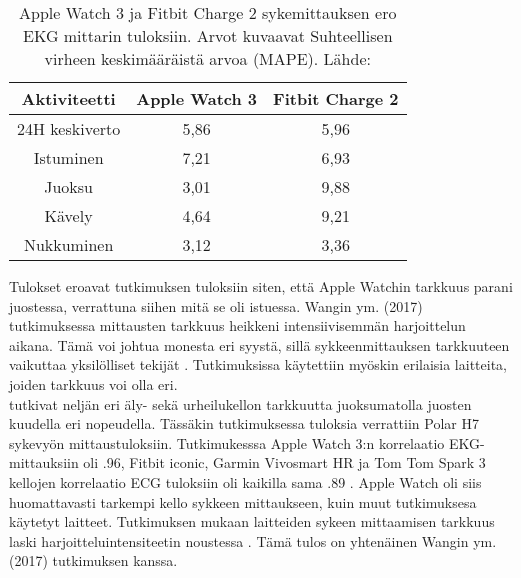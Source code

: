 \documentclass[utf8,bachelor,finnish]{bachelor}
\begin{document}
    \begin{table}[H]
     \begin{center}
      \begin{tabular}{||c c c||}   
       \hline
       Aktiviteetti & Apple Watch 3 & Fitbit Charge 2\\ [0.5ex] 
       \hline\hline
       24H keskiverto & 5,86 & 5,96\\ 
       \hline
       Istuminen & 7,21 & 6,93\\ 
       \hline
       Juoksu & 3,01 & 9,88 \\
       \hline
       Kävely & 4,64 & 9,21\\
       \hline
       Nukkuminen & 3,12 & 3,36\\[1ex] 
       \hline
      \end{tabular}
    \caption{Apple Watch 3 ja Fitbit Charge 2 sykemittauksen ero EKG mittarin tuloksiin. Arvot kuvaavat Suhteellisen virheen keskimääräistä arvoa (MAPE). Lähde: \textcite{nelson_accuracy_2019}}
     \end{center} 
    \end{table}

  Tulokset eroavat \textcite{wang_accuracy_2017} tutkimuksen tuloksiin siten, että Apple Watchin tarkkuus parani juostessa, verrattuna siihen mitä se oli istuessa. Wangin ym. (2017) tutkimuksessa
   mittausten tarkkuus heikkeni intensiivisemmän harjoittelun aikana. Tämä voi johtua monesta eri syystä, sillä sykkeenmittauksen tarkkuuteen vaikuttaa yksilölliset tekijät \parencite{koerber_accuracy_2022,pasadyn_accuracy_2019,hochstadt_continuous_2020}.
    Tutkimuksissa käytettiin myöskin erilaisia laitteita, joiden tarkkuus voi olla eri. \\

  \textcite{pasadyn_accuracy_2019} tutkivat neljän eri äly- sekä urheilukellon tarkkuutta juoksumatolla juosten kuudella eri nopeudella. Tässäkin tutkimuksessa tuloksia verrattiin
   Polar H7 sykevyön mittaustuloksiin. Tutkimukesssa Apple Watch 3:n korrelaatio EKG-mittauksiin oli .96, Fitbit iconic, Garmin Vivosmart HR ja Tom Tom Spark 3
    kellojen korrelaatio ECG tuloksiin oli kaikilla sama .89 \parencite{pasadyn_accuracy_2019}. Apple Watch oli siis huomattavasti tarkempi kello sykkeen mittaukseen,
     kuin muut tutkimuksesa käytetyt laitteet. Tutkimuksen mukaan laitteiden sykeen mittaamisen tarkkuus laski
      harjoitteluintensiteetin noustessa \parencite{pasadyn_accuracy_2019}. Tämä tulos on yhtenäinen Wangin ym. (2017) tutkimuksen kanssa.\\
  
\end{document}
